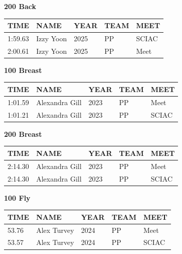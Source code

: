 \begin{table}[H]
\centering
\begin{minipage}[t]{0.48\textwidth}
\centering
\textbf{200 Back}\\[0.1cm]
\begin{tabular}{@{}p{1.8cm}p{2.8cm}p{1.2cm}p{1.4cm}p{1.4cm}@{}}
\hline
    \textbf{TIME} & \textbf{NAME} & \textbf{YEAR} & \textbf{TEAM} & \textbf{MEET} \\
\hline
    1:59.63 & Izzy Yoon & 2025 & PP & SCIAC \\
    2:00.61 & Izzy Yoon & 2025 & PP & Meet \\
\hline
\end{tabular}
\end{minipage}\hfill
\begin{minipage}[t]{0.48\textwidth}
\centering
\textbf{100 Breast}\\[0.1cm]
\begin{tabular}{@{}p{1.8cm}p{2.8cm}p{1.2cm}p{1.4cm}p{1.4cm}@{}}
\hline
    \textbf{TIME} & \textbf{NAME} & \textbf{YEAR} & \textbf{TEAM} & \textbf{MEET} \\
\hline
    1:01.59 & Alexandra Gill & 2023 & PP & Meet \\
    1:01.21 & Alexandra Gill & 2023 & PP & SCIAC \\
\hline
\end{tabular}
\end{minipage}
\end{table}

\begin{table}[H]
\centering
\begin{minipage}[t]{0.48\textwidth}
\centering
\textbf{200 Breast}\\[0.1cm]
\begin{tabular}{@{}p{1.8cm}p{2.8cm}p{1.2cm}p{1.4cm}p{1.4cm}@{}}
\hline
    \textbf{TIME} & \textbf{NAME} & \textbf{YEAR} & \textbf{TEAM} & \textbf{MEET} \\
\hline
    2:14.30 & Alexandra Gill & 2023 & PP & Meet \\
    2:14.30 & Alexandra Gill & 2023 & PP & SCIAC \\
\hline
\end{tabular}
\end{minipage}\hfill
\begin{minipage}[t]{0.48\textwidth}
\centering
\textbf{100 Fly}\\[0.1cm]
\begin{tabular}{@{}p{1.8cm}p{2.8cm}p{1.2cm}p{1.4cm}p{1.4cm}@{}}
\hline
    \textbf{TIME} & \textbf{NAME} & \textbf{YEAR} & \textbf{TEAM} & \textbf{MEET} \\
\hline
    53.76 & Alex Turvey & 2024 & PP & Meet \\
    53.57 & Alex Turvey & 2024 & PP & SCIAC \\
\hline
\end{tabular}
\end{minipage}
\end{table}

